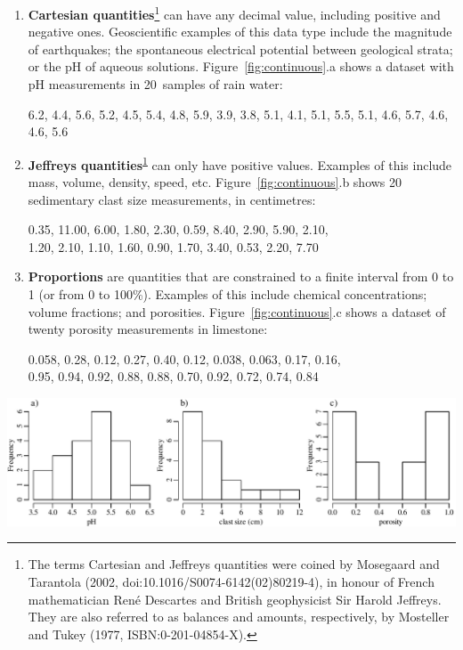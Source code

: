 \begin{enumerate}
\item\textbf{Cartesian quantities}\footnote{The terms Cartesian and
Jeffreys quantities were coined by Mosegaard and Tarantola (2002,
doi:10.1016/S0074-6142(02)80219-4), in honour of French mathematician
Ren\'{e} Descartes and British geophysicist Sir Harold Jeffreys. They
are also referred to as balances and amounts, respectively, by
Mosteller and Tukey (1977, ISBN:0-201-04854-X).\label{ftn:Tarantola}}
  can have any decimal value, including positive and negative
  ones. Geoscientific examples of this data type include the magnitude
  of earthquakes; the spontaneous electrical potential between
  geological strata; or the pH of aqueous
  solutions. Figure~\ref{fig:continuous}.a shows a dataset with pH
  measurements in 20~samples of rain water:
  \begin{center}
    6.2, 4.4, 5.6, 5.2, 4.5, 5.4, 4.8, 5.9, 3.9, 3.8, 5.1, 4.1, 5.1, 5.5,
    5.1, 4.6, 5.7, 4.6, 4.6, 5.6
  \end{center}
\item\textbf{Jeffreys quantities}\textsuperscript{\ref{ftn:Tarantola}}
  can only have positive values. Examples of this include mass,
  volume, density, speed, etc. Figure~\ref{fig:continuous}.b shows 20
  sedimentary clast size measurements, in centimetres:
  \begin{center}
    0.35, 11.00, 6.00, 1.80, 2.30, 0.59, 8.40, 2.90, 5.90, 2.10,\\
    1.20, 2.10, 1.10, 1.60, 0.90, 1.70, 3.40, 0.53, 2.20, 7.70
  \end{center}
\item\textbf{Proportions} are quantities that are constrained to a
  finite interval from 0 to 1 (or from 0 to 100\%). Examples of this
  include chemical concentrations; volume fractions; and porosities.
  Figure~\ref{fig:continuous}.c shows a dataset of twenty porosity
  measurements in limestone:
  \begin{center}
    0.058, 0.28, 0.12, 0.27, 0.40, 0.12, 0.038, 0.063, 0.17, 0.16,\\
    0.95, 0.94, 0.92, 0.88, 0.88, 0.70, 0.92, 0.72, 0.74, 0.84
  \end{center}
\end{enumerate}

\noindent\includegraphics[width=\textwidth]{../figures/continuous.pdf}\medskip
\begingroup {}
\label{fig:continuous}
\endgroup

